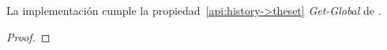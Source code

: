\begin{lemma}
  La implementación \hashchain cumple la propiedad~\ref{api:history->theset} \textit{Get-Global} de \setchain.
\end{lemma}

\begin{proof}



\end{proof}
